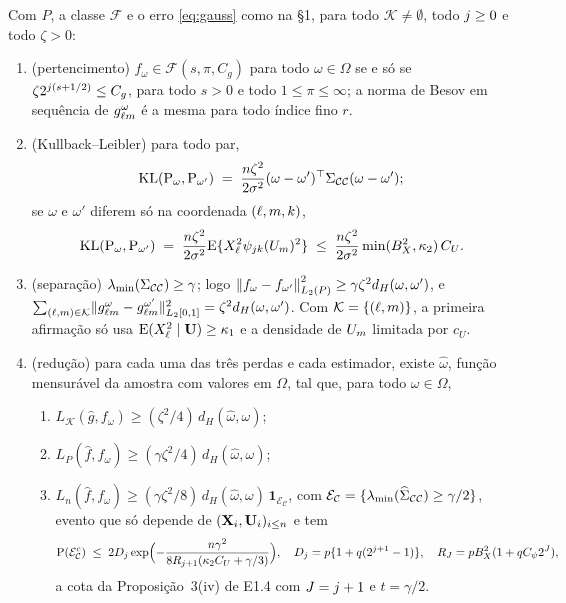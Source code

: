\documentclass[11pt,a4paper]{article}
\newcommand{\lmin}{\lambda_{\min}}
\newcommand{\Kcal}{\mathcal{K}}
\newcommand{\Ccal}{\mathcal{C}}
\newcommand{\Fcal}{\mathcal{F}}
\newcommand{\dH}{d_{H}}
\newcommand{\ECc}{\mathcal{E}_{\mathcal{C}}}
\newcommand{\KL}{\operatorname{KL}}
\newcommand{\Lk}{L_{\mathcal{K}}}
\begin{document}
\begin{lemma}\label{lem:hipercubo}
Com $P$, a classe $\Fcal$ e o erro \eqref{eq:gauss} como na §1, para todo
$\Kcal \ne \emptyset$, todo $j \ge 0$ e todo $\zeta > 0$:
\begin{enumerate}[label=\textup{(\roman*)}, leftmargin=*]
  \item \textup{(pertencimento)} $f_{\omega} \in \Fcal(s,\pi,C_{g})$ para todo
    $\omega \in \Omega$ se e só se $\zeta2^{j(s+1/2)} \le C_{g}$, para
    todo $s > 0$ e todo $1 \le \pi \le \infty$; a norma de Besov em sequência
    de $g_{\ell m}^{\omega}$ é a mesma para todo índice fino $r$.
  \item \textup{(Kullback--Leibler)} para todo par,
    \[
      \KL(\Prob_{\omega},\Prob_{\omega'}) \;=\; \frac{n\zeta^{2}}{2\sigma^{2}}
      (\omega - \omega')\T\Gram_{\Ccal\Ccal}(\omega - \omega');
    \]
    se $\omega$ e $\omega'$ diferem só na coordenada $(\ell,m,k)$,
    \[
      \KL(\Prob_{\omega},\Prob_{\omega'}) \;=\; \frac{n\zeta^{2}}{2\sigma^{2}}
      \E\{X_{\cv}^{2}\wav{\lev}{\tsl}(U_{\md})^{2}\}
      \;\le\; \frac{n\zeta^{2}}{2\sigma^{2}}\min(B_{X}^{2},\kappa_{2})\,C_{U}.
    \]
  \item \textup{(separação)} $\lmin(\Gram_{\Ccal\Ccal}) \ge \gamma$; logo
    $\normL{f_{\omega} - f_{\omega'}}^{2} \ge \gamma\zeta^{2}\dH(\omega,\omega')$,
    e $\sum_{(\cv,\md)\in\Kcal}\lVert\gcomp{\cv}{\md}^{\omega} -
    \gcomp{\cv}{\md}^{\omega'}\rVert_{L_{2}[0,1]}^{2} =
    \zeta^{2}\dH(\omega,\omega')$. Com $\Kcal = \{(\cv,\md)\}$, a primeira
    afirmação só usa $\mathrm{E}(X_{\ell}^{2}\mid\mathbf{U}) \ge \kappa_{1}$ e a densidade de
    $U_{m}$ limitada por $c_{U}$.
  \item \textup{(redução)} para cada uma das três perdas e cada estimador,
    existe $\widehat\omega$, função mensurável da amostra com valores em
    $\Omega$, tal que, para todo $\omega \in \Omega$,
    \begin{enumerate}[label=\textup{(\alph*)}, leftmargin=*, nosep]
      \item $\Lk(\widehat g, f_{\omega}) \ge (\zeta^{2}/4)\,\dH(\widehat\omega,\omega)$;
      \item $L_{P}(\widehat f, f_{\omega}) \ge (\gamma\zeta^{2}/4)\,\dH(\widehat\omega,\omega)$;
      \item $L_{n}(\widehat f, f_{\omega}) \ge (\gamma\zeta^{2}/8)\,\dH(\widehat\omega,\omega)
        \,\mathbf{1}_{\ECc}$, com $\ECc = \{\lmin(\Gramhat_{\Ccal\Ccal}) \ge \gamma/2\}$,
        evento que só depende de $(\mathbf{X}_{i},\mathbf{U}_{i})_{i\le n}$ e tem
        \begin{equation}
          \label{eq:evento}
          \Prob(\ECc^{c}) \;\le\; 2D_{\lev}\exp\Bigl(-\frac{n\gamma^{2}}
          {8R_{\lev+1}(\kappa_{2}C_{U} + \gamma/3)}\Bigr),
          \quad D_{\lev} = p\{1 + q(2^{\lev+1}-1)\},
          \quad R_{J} = pB_{X}^{2}(1 + qC_{\psi}2^{J}),
        \end{equation}
        a cota da Proposição~3(iv) de E1.4 com $J = j + 1$ e $t = \gamma/2$.
    \end{enumerate}
\end{enumerate}
\end{lemma}
\end{document}

